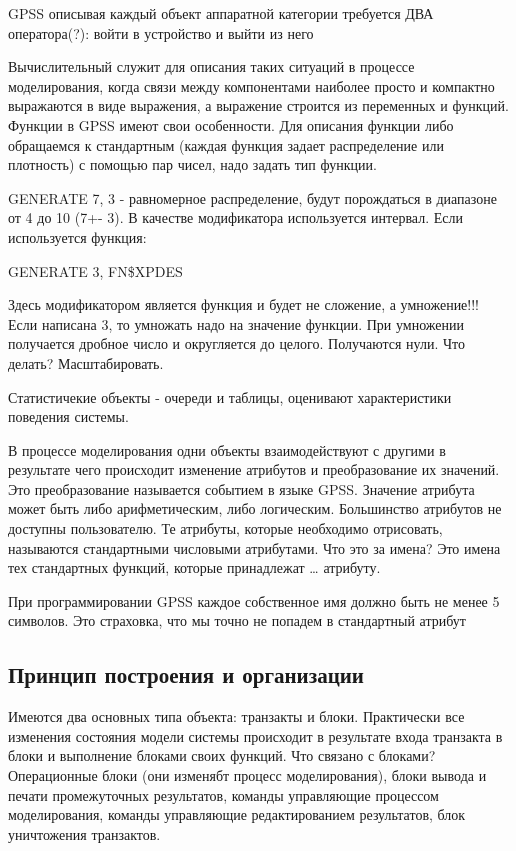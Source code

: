 \documentclass[14pt]{extarticle}
\begin{document}
GPSS описывая каждый объект аппаратной категории требуется ДВА оператора(?): войти в устройство и выйти из него

Вычислительный служит для описания таких ситуаций в процессе моделирования, когда связи между компонентами наиболее просто и компактно выражаются в виде выражения, а выражение строится из переменных и функций. Функции в GPSS имеют свои особенности. Для описания функции либо обращаемся к стандартным (каждая функция задает распределение или плотность) с помощью пар чисел, надо задать тип функции.

GENERATE 7, 3 - равномерное распределение, будут порождаться в диапазоне от 4 до 10 (7+- 3). В качестве модификатора используется интервал. Если используется функция:

GENERATE 3, FN\$XPDES


Здесь модификатором является функция и будет не сложение, а умножение!!! Если написана 3, то умножать надо на значение функции. При умножении получается дробное число и округляется до целого. Получаются нули. Что делать? Масштабировать. 

Статистичекие объекты - очереди и таблицы, оценивают характеристики поведения системы.

В процессе моделирования одни объекты взаимодействуют с другими в результате чего происходит изменение атрибутов и преобразование их значений. Это преобразование называется событием в языке GPSS. Значение атрибута может быть либо арифметическим, либо логическим. Большинство атрибутов не доступны пользователю. Те атрибуты, которые необходимо отрисовать, называются стандартными числовыми атрибутами. Что это за имена? Это имена тех стандартных функций, которые принадлежат … атрибуту. 

При программировании GPSS каждое собственное имя должно быть не менее 5 символов. Это страховка, что мы точно не попадем в стандартный атрибут

\subsection*{Принцип построения и организации}

Имеются два основных типа объекта: транзакты и блоки. Практически все изменения состояния модели системы происходит в результате входа транзакта в блоки и выполнение блоками своих функций. Что связано с блоками? Операционные блоки (они изменябт процесс моделирования), блоки вывода и печати промежуточных результатов, команды управляющие процессом моделирования, команды управляющие редактированием результатов, блок уничтожения транзактов.
\end{document}
